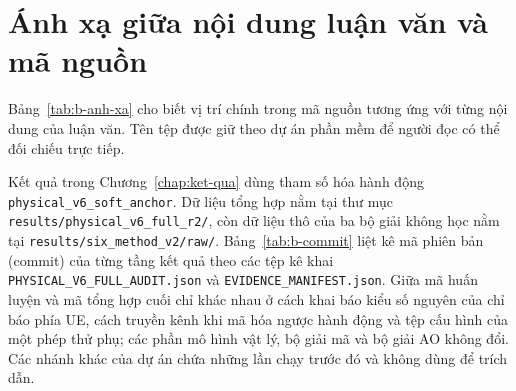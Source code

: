 \section{Ánh xạ giữa nội dung luận văn và mã nguồn}
\label{sec:anh-xa-ma-nguon}

Bảng~\ref{tab:b-anh-xa} cho biết vị trí chính trong mã nguồn tương ứng với từng nội dung
của luận văn. Tên tệp được giữ theo dự án phần mềm để người đọc có thể đối chiếu trực tiếp.

Kết quả trong Chương~\ref{chap:ket-qua} dùng tham số hóa hành động
\texttt{physical\_v6\_}\allowbreak\texttt{soft\_anchor}. Dữ liệu tổng hợp nằm tại thư mục
\texttt{results/physical\_v6\_full\_r2/}, còn dữ liệu thô của ba bộ giải không học nằm tại
\texttt{results/six\_method\_v2/raw/}. Bảng~\ref{tab:b-commit} liệt kê mã phiên bản (commit)
của từng tầng kết quả theo các tệp kê khai
\texttt{PHYSICAL\_V6\_}\allowbreak\texttt{FULL\_}\allowbreak\texttt{AUDIT.json} và
\texttt{EVIDENCE\_}\allowbreak\texttt{MANIFEST.json}. Giữa mã huấn luyện và mã tổng hợp cuối chỉ khác nhau ở cách
khai báo kiểu số nguyên của chỉ báo phía UE, cách truyền kênh khi mã hóa ngược hành động và
tệp cấu hình của một phép thử phụ; các phần mô hình vật lý, bộ giải mã và bộ giải AO không
đổi. Các nhánh khác của dự án chứa những lần chạy trước đó và không dùng để trích dẫn.

